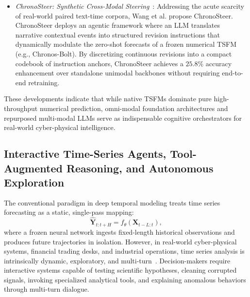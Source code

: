 \begin{itemize}[leftmargin=*]
    \item \emph{ChronoSteer: Synthetic Cross-Modal Steering}~\cite{wang2025chronosteer}: Addressing the acute scarcity of real-world paired text-time corpora, Wang et al. propose ChronoSteer. ChronoSteer deploys an agentic framework where an LLM translates narrative contextual events into structured revision instructions that dynamically modulate the zero-shot forecasts of a frozen numerical TSFM (e.g., Chronos-Bolt). By discretizing continuous revisions into a compact codebook of instruction anchors, ChronoSteer achieves a $25.8\%$ accuracy enhancement over standalone unimodal backbones without requiring end-to-end retraining.
\end{itemize}

These developments indicate that while native TSFMs dominate pure high-throughput numerical prediction, omni-modal foundation architectures and repurposed multi-modal LLMs serve as indispensable cognitive orchestrators for real-world cyber-physical intelligence.

\subsection{Interactive Time-Series Agents, Tool-Augmented Reasoning, and Autonomous Exploration}
\label{sec:interactive_time_series_agents}

The conventional paradigm in deep temporal modeling treats time series forecasting as a static, single-pass mapping:
\begin{equation}
    \hat{\mathbf{Y}}_{t:t+H} = f_\theta(\mathbf{X}_{t-L:t}),
\end{equation}
where a frozen neural network ingests fixed-length historical observations and produces future trajectories in isolation. However, in real-world cyber-physical systems, financial trading desks, and industrial operations, time series analysis is intrinsically dynamic, exploratory, and multi-turn~\cite{kong2026timesagemt}. Decision-makers require interactive systems capable of testing scientific hypotheses, cleaning corrupted signals, invoking specialized analytical tools, and explaining anomalous behaviors through multi-turn dialogue.

